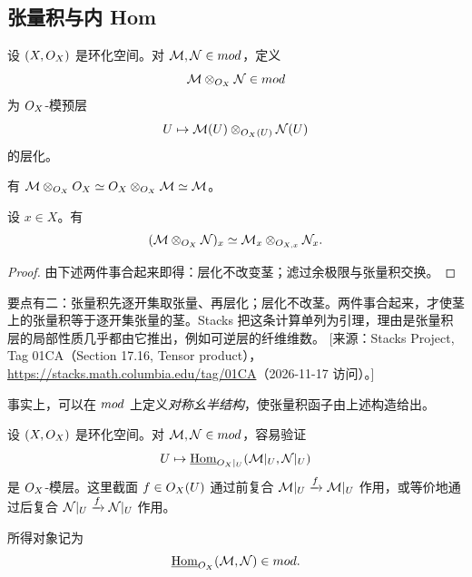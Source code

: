 \subsection{张量积与内 Hom}\label{sec:12.4}

\begin{construction}\label{con:12.4.1}
设 $(X,O_X)$ 是环化空间。对 $\mathcal{M},\mathcal{N}\in mod$，定义
\[
\mathcal{M}\otimes_{O_X}\mathcal{N}\in mod
\]
为 $O_X$-模预层
\[
U\mapsto\mathcal{M}(U)\otimes_{O_X(U)}\mathcal{N}(U)
\]
的层化。
\end{construction}

\begin{example}\label{ex:12.4.2}
有 $\mathcal{M}\otimes_{O_X}O_X\simeq O_X\otimes_{O_X}\mathcal{M}\simeq\mathcal{M}$。
\end{example}

\begin{lemma}\label{lem:12.4.3}
设 $x\in X$。有
\[
(\mathcal{M}\otimes_{O_X}\mathcal{N})_x\simeq\mathcal{M}_x\otimes_{O_{X,x}}\mathcal{N}_x.
\]
\end{lemma}

\begin{proof}
由下述两件事合起来即得：层化不改变茎；滤过余极限与张量积交换。
\end{proof}

\begin{yizhu}
要点有二：张量积先逐开集取张量、再层化；层化不改茎。两件事合起来，才使茎上的张量积等于逐开集张量的茎。Stacks 把这条计算单列为引理，理由是张量积层的局部性质几乎都由它推出，例如可逆层的纤维维数。
[来源：Stacks Project, Tag 01CA（Section 17.16, Tensor product），\url{https://stacks.math.columbia.edu/tag/01CA}（2026-11-17 访问）。]
\end{yizhu}

\begin{remark}\label{rem:12.4.4}
事实上，可以在 $mod$ 上定义\emph{对称幺半结构}，使张量积函子由上述构造给出。
\end{remark}

\begin{construction}\label{con:12.4.5}
设 $(X,O_X)$ 是环化空间。对 $\mathcal{M},\mathcal{N}\in mod$，容易验证
\[
U\mapsto\underline{\mathrm{Hom}}_{O_X|_U}(\mathcal{M}|_U,\mathcal{N}|_U)
\]
是 $O_X$-模层。这里截面 $f\in O_X(U)$ 通过前复合 $\mathcal{M}|_U\xrightarrow{f}\mathcal{M}|_U$ 作用，或等价地通过后复合 $\mathcal{N}|_U\xrightarrow{f}\mathcal{N}|_U$ 作用。

所得对象记为
\[
\underline{\mathrm{Hom}}_{O_X}(\mathcal{M},\mathcal{N})\in mod.
\]
\end{construction}

